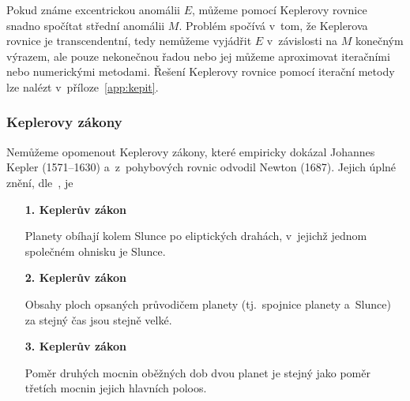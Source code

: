 \documentclass[A4paper, 12pt, oneside, openany]{book}
\begin{document}
Pokud známe excentrickou anomálii $E$, můžeme pomocí Keplerovy rovnice snadno spočítat střední anomálii $M$. Problém spočívá v~tom, že Keplerova rovnice je transcendentní, tedy nemůžeme vyjádřit $E$ v~závislosti na $M$ konečným výrazem, ale pouze nekonečnou řadou nebo jej můžeme aproximovat iteračními nebo numerickými metodami. Řešení Keplerovy rovnice pomocí iterační metody lze nalézt v~příloze~\ref{app:kepit}.

\subsubsection{Keplerovy zákony} \label{sec:kepzak}

Nemůžeme opomenout Keplerovy zákony, které empiricky dokázal Johannes Kepler (1571--1630) a~z~pohybových rovnic odvodil Newton (1687). Jejich úplné znění, dle~\cite{wiki:kepzak}, je 
\begin{enumerate}[wide]
	\item[\textbf{1. Keplerův zákon}] \ 

Planety obíhají kolem Slunce po eliptických drahách, v~jejichž jednom společném ohnisku je Slunce.
	\item[\textbf{2. Keplerův zákon}] \ 

Obsahy ploch opsaných průvodičem planety (tj.\ spojnice planety a~Slunce) za stejný čas jsou stejně velké.
	\item[\textbf{3. Keplerův zákon}] \ 

Poměr druhých mocnin oběžných dob dvou planet je stejný jako poměr třetích mocnin jejich hlavních poloos.
\end{enumerate}
\end{document}
